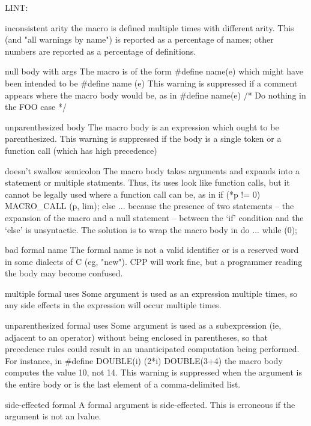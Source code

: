 LINT:

inconsistent arity
        the macro is defined multiple times with different arity.
        This (and "all warnings by name") is reported as a percentage of
        names; other numbers are reported as a percentage of definitions.

null body with args
        The macro is of the form
                #define name(e)
        which might have been intended to be
                #define name (e)
        This warning is suppressed if a comment appears where the macro
        body would be, as in
                #define name(e)         /* Do nothing in the FOO case */

unparenthesized body
        The macro body is an expression which ought to be parenthesized.
        This warning is suppressed if the body is a single token or a
        function call (which has high precedence)

doesn't swallow semicolon
        The macro body takes arguments and expands into a statement or
        multiple statments.  Thus, its uses look like function calls, but
        it cannot be legally used where a function call can be, as in
             if (*p != 0)
               MACRO_CALL (p, lim);
             else ...
        because the presence of two statements -- the expansion of the macro and
        a null statement -- between the `if' condition and the `else'
        is unsyntactic.  The solution is to wrap the macro body in
             do {...} while (0);

bad formal name
        The formal name is not a valid identifier or is a reserved word in
        some dialects of C (eg, "new").  CPP will work fine, but a
        programmer reading the body may become confused.

multiple formal uses
        Some argument is used as an expression multiple times, so any side
        effects in the expression will occur multiple times.

unparenthesized formal uses
        Some argument is used as a subexpression (ie, adjacent to an
        operator) without being enclosed in parentheses, so that precedence
        rules could result in an unanticipated computation being performed.
        For instance, in
                #define DOUBLE(i) (2*i)
                DOUBLE(3+4)
        the macro body computes the value 10, not 14.
        This warning is suppressed when the argument is the entire body
        or is the last element of a comma-delimited list.

side-effected formal
        A formal argument is side-effected.  This is erroneous if the
        argument is not an lvalue.

